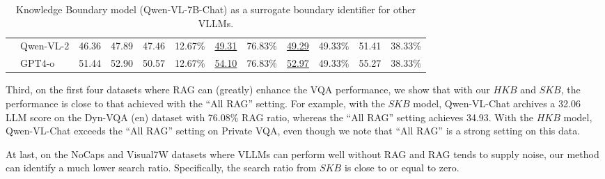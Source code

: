 \begin{table*}[t]
{\begin{tabular}{llcccccccc|cc}
     & Qwen-VL-2 & 46.36 & 47.89 & 47.46 & 12.67\% & \uline{49.31} & 76.83\% & \uline{49.29} & 49.33\% & 51.41 & 38.33\% \\
     & GPT4-o & 51.44 & 52.90 & 50.57 & 12.67\% & \uline{54.10} & 76.83\% & \uline{52.97} & 49.33\% & 55.27 & 38.33\% \\
    \bottomrule
    \end{tabular}
    }
    \caption{Knowledge Boundary model (Qwen-VL-7B-Chat) as a surrogate boundary identifier for other VLLMs. }
    \label{main_results_llm_table}
\end{table*}

Third, on the first four datasets where RAG can (greatly) enhance the VQA performance, we show that with our $HKB$ and $SKB$, the performance is close to that achieved with the ``All RAG'' setting. For example, with the $SKB$ model, Qwen-VL-Chat archives a 32.06 LLM score on the Dyn-VQA (en) dataset with 76.08\% RAG ratio, whereas the ``All RAG'' setting achieves 34.93. With the $HKB$ model, Qwen-VL-Chat exceeds the ``All RAG'' setting on Private VQA, even though we note that ``All RAG'' is a strong setting on this data. 

At last, on the NoCaps and Visual7W datasets where VLLMs can perform well without RAG and RAG tends to supply noise, our method can identify a much lower search ratio. Specifically, the search ratio from $SKB$ is close to or equal to zero.

